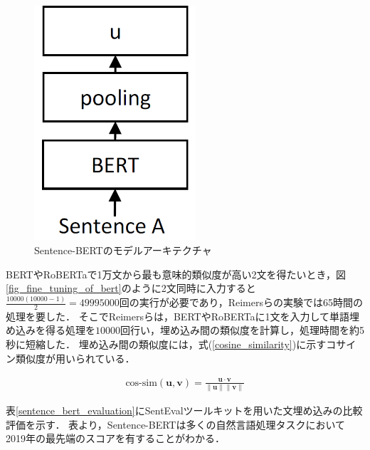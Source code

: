 \documentclass[12pt,a4j,dvipdfmx]{jreport}
\begin{document}


\begin{figure}[H]
	\centering
	\includegraphics[keepaspectratio, width=60mm]{img/sentence-bert.png}
	\caption{Sentence-BERTのモデルアーキテクチャ\protect\footnotemark[8]}
	\label{fig_sentence_bert}
\end{figure}

\newpage

BERTやRoBERTaで1万文から最も意味的類似度が高い2文を得たいとき，図\ref{fig_fine_tuning_of_bert}のように2文同時に入力すると$\frac{10000(10000-1)}{2}=49995000$回の実行が必要であり，Reimersらの実験では65時間の処理を要した．
そこでReimersらは，BERTやRoBERTaに1文を入力して単語埋め込みを得る処理を$10000$回行い，埋め込み間の類似度を計算し，処理時間を約5秒に短縮した．
埋め込み間の類似度には，式(\ref{cosine_similarity})に示すコサイン類似度が用いられている．

\begin{align}
  \text{cos-sim}\left(\bm{u}, \bm{v}\right) = \frac{\bm{u} \cdot \bm{v}}{\|\bm{u}\|\|\bm{v}\|}
  \label{cosine_similarity}
\end{align}

表\ref{sentence_bert_evaluation}にSentEvalツールキットを用いた文埋め込みの比較評価を示す．
表より，Sentence-BERTは多くの自然言語処理タスクにおいて2019年の最先端のスコアを有することがわかる．
\end{document}
